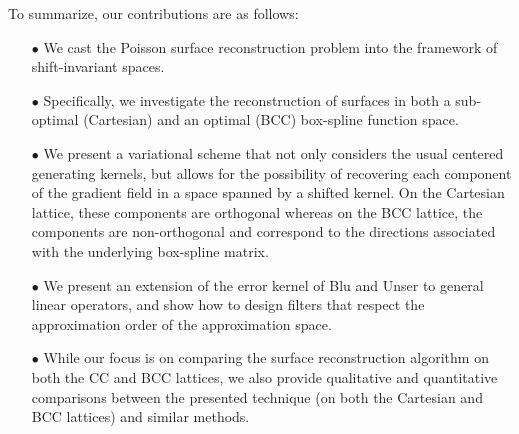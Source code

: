 To summarize, our contributions are as follows:
\begin{itemize}
\item[$\bullet$] We cast the Poisson surface reconstruction problem into the framework of shift-invariant spaces.
\item[$\bullet$] Specifically, we investigate the reconstruction of surfaces in both a sub-optimal (Cartesian) and an optimal (BCC)
  box-spline function space.
\item[$\bullet$] We present a variational scheme that not only considers the usual centered generating kernels, but allows for the
  possibility of recovering each component of the gradient field in a space spanned by a shifted kernel. On the Cartesian
  lattice, these components are orthogonal whereas on the BCC lattice,  the components are non-orthogonal and correspond to the directions associated with the underlying box-spline matrix.
\item[$\bullet$] We present an extension of the error kernel of Blu and Unser to general linear operators, and show how to design filters that respect the approximation order of the approximation space.
\item[$\bullet$] While our focus is on comparing the surface reconstruction algorithm on both the CC and BCC lattices, we also provide qualitative and quantitative comparisons between the presented technique (on both the Cartesian and BCC lattices) and similar methods. 
\end{itemize}


